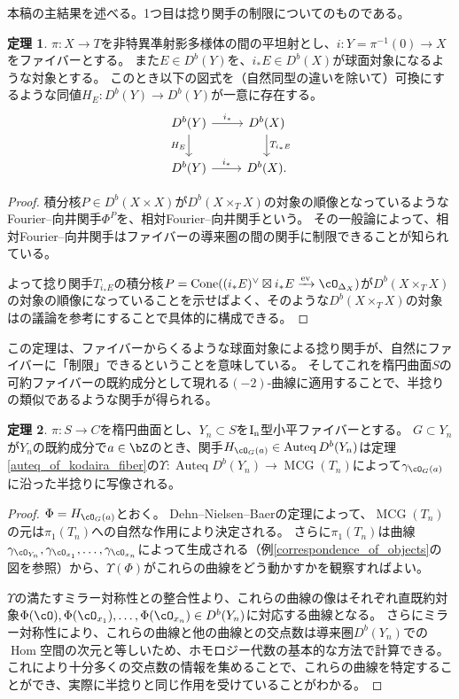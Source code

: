 \documentclass[uplatex,a4paper,dvipdfmx]{jsarticle}
\numberwithin{equation}{section}
\theoremstyle{definition}
\newtheorem{theorem}{定理}[section]
\DeclareMathOperator{\Hom}{\mathrm{Hom}}
\DeclareMathOperator{\Auteq}{\mathrm{Auteq}}
\DeclareMathOperator{\Cone}{\mathrm{Cone}}
\DeclareMathOperator{\ev}{\mathrm{ev}}
\DeclareMathOperator{\MCG}{\mathrm{MCG}}
\begin{document}
本稿の主結果を述べる。1つ目は捻り関手の制限についてのものである。
\begin{theorem}
	$\pi \colon X \to T$を非特異凖射影多様体の間の平坦射とし、$i \colon Y = \pi^{-1}(0) \to X$をファイバーとする。
	また$E \in D^b(Y)$を、$i_*E \in D^b(X)$が球面対象になるような対象とする。
	このとき以下の図式を（自然同型の違いを除いて）可換にするような同値$H_E \colon D^b(Y) \to D^b(Y)$が一意に存在する。
	\begin{equation}
		\begin{tikzcd}
			D^b(Y) \arrow[r,"i_*"]\arrow[d, "H_E"'] & D^b(X) \arrow[d,"T_{i_*E}"]\\
			D^b(Y) \arrow[r, "i_*"]& D^b(X).
		\end{tikzcd}
	\end{equation}
\end{theorem}
\begin{proof}
	積分核$P \in D^b(X \times X)$が$D^b(X \times_T X)$の対象の順像となっているようなFourier--向井関手$\Phi^P$を、相対Fourier--向井関手という。
	その一般論によって、相対Fourier--向井関手はファイバーの導来圏の間の関手に制限できることが知られている。

	よって捻り関手$T_{i_*E}$の積分核$P = \Cone((i_*E)^\vee \boxtimes i_*E \xrightarrow{\ev} \cO_{\Delta_X})$が$D^b(X \times_T X)$の対象の順像になっていることを示せばよく、そのような$D^b(X \times_T X)$の対象は\cite{MR2200048}の議論を参考にすることで具体的に構成できる。
\end{proof}
この定理は、ファイバーからくるような球面対象による捻り関手が、自然にファイバーに「制限」できるということを意味している。
そしてこれを楕円曲面$S$の可約ファイバーの既約成分として現れる$(-2)$-曲線に適用することで、半捻りの類似であるような関手が得られる。
\begin{theorem}
	$\pi \colon S \to C$を楕円曲面とし、$Y_n \subset S$を$\rm{I}_n$型小平ファイバーとする。
	$G \subset Y_n$が$Y_n$の既約成分で$a \in \bZ$のとき、関手$H_{\cO_G(a)} \in \Auteq D^b(Y_n)$は定理\ref{auteq_of_kodaira_fiber}の$\Upsilon \colon \Auteq D^b(Y_n) \to \MCG(T_n)$によって$\gamma_{\cO_G(a)}$に沿った半捻りに写像される。
\end{theorem}
\begin{proof}
	$\Phi = H_{\cO_G(a)}$とおく。
	Dehn--Nielsen--Baerの定理によって、$\MCG(T_n)$の元は$\pi_1(T_n)$への自然な作用により決定される。
	さらに$\pi_1(T_n)$は曲線$\gamma_{\cO_{Y_n}}, \gamma_{\cO_{x_1}}, \dots, \gamma_{\cO_{x_n}}$によって生成される（例\ref{correspondence_of_objects}の図を参照）から、$\Upsilon(\Phi)$がこれらの曲線をどう動かすかを観察すればよい。

	$\Upsilon$の満たすミラー対称性との整合性より、これらの曲線の像はそれぞれ直既約対象$\Phi(\cO), \Phi(\cO_{x_1}), \dots, \Phi(\cO_{x_n}) \in D^b(Y_n)$に対応する曲線となる。
	さらにミラー対称性により、これらの曲線と他の曲線との交点数は導来圏$D^b(Y_n)$での$\Hom$空間の次元と等しいため、ホモロジー代数の基本的な方法で計算できる。
	これにより十分多くの交点数の情報を集めることで、これらの曲線を特定することができ、実際に半捻りと同じ作用を受けていることがわかる。
\end{proof}
\end{document}
